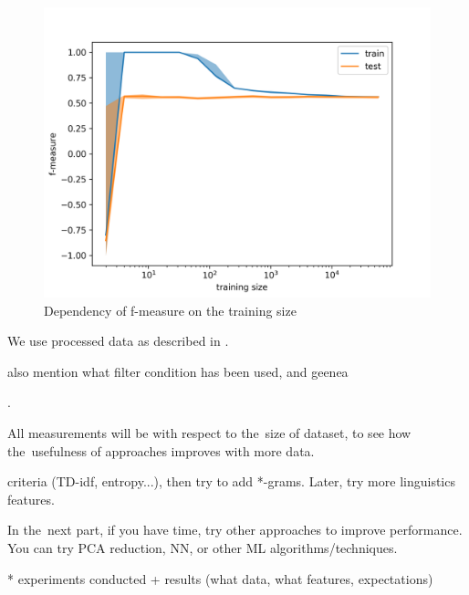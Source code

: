 \begin{figure}[h]\centering
\includegraphics[width=130mm]{figures/l_curves_f_measure.png}
\caption{Dependency of f-measure on the training size}
\label{fig:l_curves_f_measure}
\end{figure}


We use processed data as described in .

also mention what filter condition has been used, and geenea


.

All measurements will be with respect to the~size of dataset, to see how the~usefulness of approaches improves with more data.

criteria (TD-idf, entropy...), then try to add *-grams. Later, try more linguistics features.

In the~next part, if you have time, try other approaches to improve performance. You can try PCA reduction, NN, or other ML algorithms/techniques.

* experiments conducted + results (what data, what features, expectations)


